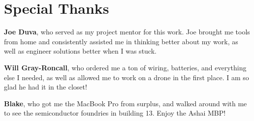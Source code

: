 \documentclass{article}
\begin{document}
\section{Special Thanks}
\textbf{Joe Duva}, who served as my project mentor for this work. Joe brought me tools from home and consistently assisted me in thinking better about my work, as well as engineer solutions better when I was stuck.

\textbf{Will Gray-Roncall}, who ordered me a ton of wiring, batteries, and everything else I needed, as well as allowed me to work on a drone in the first place. I am so glad he had it in the closet!

\textbf{Blake}, who got me the MacBook Pro from surplus, and walked around with me to see the semiconductor foundries in building 13. Enjoy the Ashai MBP!
\end{document}
